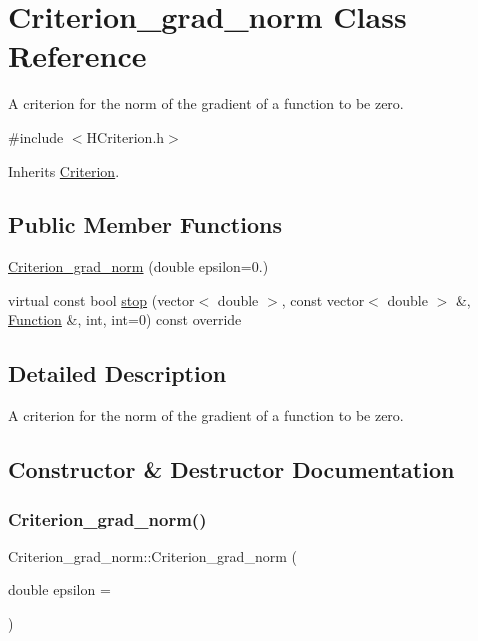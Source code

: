 \hypertarget{class_criterion__grad__norm}{}\section{Criterion\+\_\+grad\+\_\+norm Class Reference}
\label{class_criterion__grad__norm}


A criterion for the norm of the gradient of a function to be zero.  




{\ttfamily \#include $<$H\+Criterion.\+h$>$}



Inherits \hyperlink{class_criterion}{Criterion}.

\subsection*{Public Member Functions}
\begin{DoxyCompactItemize}
\item 
\hyperlink{class_criterion__grad__norm_a6cff1d7b06fbb844e741cd3c3a3b1d14}{Criterion\+\_\+grad\+\_\+norm} (double epsilon=0.)
\item 
virtual const bool \hyperlink{class_criterion__grad__norm_ae95aa823069c1fcbcd333eacd00f78c9}{stop} (vector$<$ double $>$, const vector$<$ double $>$ \&, \hyperlink{class_function}{Function} \&, int, int=0) const override
\end{DoxyCompactItemize}


\subsection{Detailed Description}
A criterion for the norm of the gradient of a function to be zero. 

\subsection{Constructor \& Destructor Documentation}
\mbox{\label{class_criterion__grad__norm_a6cff1d7b06fbb844e741cd3c3a3b1d14}} 
\subsubsection{\texorpdfstring{Criterion\+\_\+grad\+\_\+norm()}{Criterion\_grad\_norm()}}
{\footnotesize\ttfamily Criterion\+\_\+grad\+\_\+norm\+::\+Criterion\+\_\+grad\+\_\+norm (\begin{DoxyParamCaption}\item[{double}]{epsilon = {} }\end{DoxyParamCaption})\hspace{0.3cm}{\ttfamily [inline]}}




